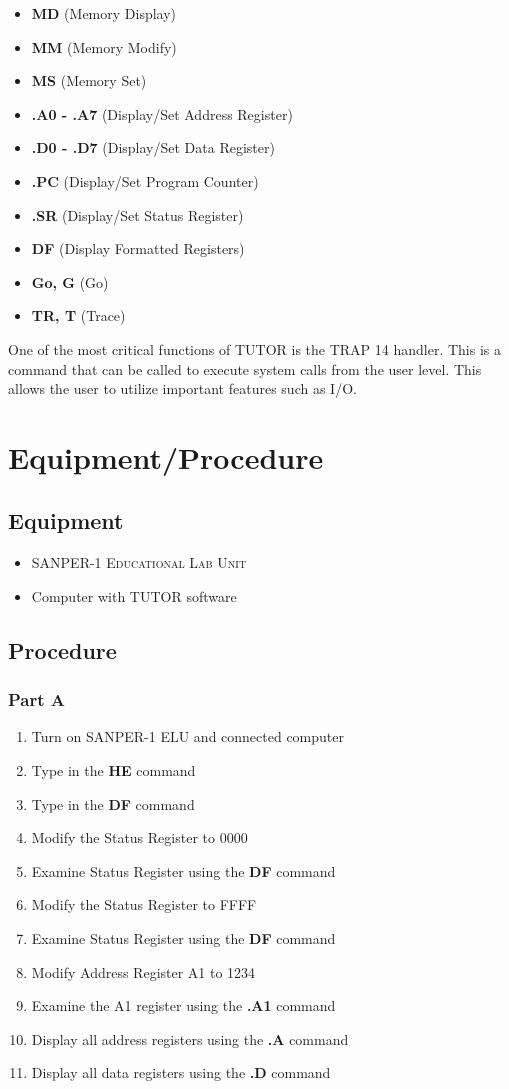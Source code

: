 \documentclass[12pt, twocolumn]{article}
\begin{document}
\begin{itemize}
	\item \textbf{MD} (Memory Display)
	\item \textbf{MM} (Memory Modify)
	\item \textbf{MS} (Memory Set)
	\item \textbf{.A0 - .A7} (Display/Set Address Register)
	\item \textbf{.D0 - .D7} (Display/Set Data Register)
	\item \textbf{.PC} (Display/Set Program Counter)
	\item \textbf{.SR} (Display/Set Status Register)
	\item \textbf{DF} (Display Formatted Registers)
	\item \textbf{Go, G} (Go)
	\item \textbf{TR, T} (Trace)
	
\end{itemize} 
One of the most critical functions of \textsc{TUTOR} is the TRAP 14 handler. This is a command that can be called to execute system calls from the user level. This allows the user to utilize important features such as I/O\cite{ecbm}.
\section{Equipment/Procedure}
\subsection{Equipment}
\begin{itemize}
	\item \textsc{SANPER-1 Educational Lab Unit}
	\item Computer with TUTOR software
\end{itemize}
\subsection{Procedure}
\subsubsection{Part A}
\begin{enumerate}
	\item Turn on \textsc{SANPER-1 ELU} and connected computer
	\item Type in the \textbf{HE} command
	\item Type in the \textbf{DF} command
	\item Modify the Status Register to 0000
	\item Examine Status Register using the \textbf{DF} command
	\item Modify the Status Register to FFFF
	\item Examine Status Register using the \textbf{DF} command
	\item Modify Address Register A1 to 1234
	\item Examine the A1 register using the \textbf{.A1} command
	\item Display all address registers using the \textbf{.A} command
	\item Display all data registers using the \textbf{.D} command
\end{enumerate}
\end{document}
